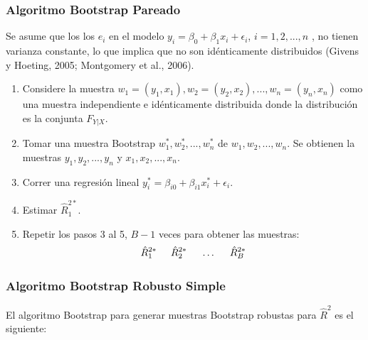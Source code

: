 \subsubsection{Algoritmo Bootstrap Pareado}

Se asume que los los $e_{i}$ en el modelo
$ y_{i} = \beta_{0} +\beta_{1}x_{i} + \epsilon_{i}$, $i=1,2,..., n$ , no tienen varianza constante, lo que implica que no son idénticamente distribuidos (Givens y Hoeting, 2005; Montgomery et al., 2006).

\begin{enumerate}
	\item Considere la muestra $ w_{1} = (y_{1}, x_{1}),  w_{2} = (y_{2}, x_{2}), ..., w_{n} = (y_{n}, x_{n})$ como una muestra independiente e idénticamente distribuida donde la distribución es la conjunta $ F_{Y|X} $.
	
	\item  Tomar una muestra Bootstrap  $ w^{*}_{1}, w^{*}_{2},...,  w^{*}_{n} $ de $w_{1}, w_{2},...,  w_{n} $. Se obtienen la muestras  $y_{1}, y_{2},...,  y_{n} $ y  $x_{1}, x_{2},...,  x_{n} $.
	
	\item Correr una regresión lineal $ y^{*}_{i} = \beta_{i0} +\beta_{i1}x_{i}^{*} + \epsilon_{i} $.
	
	\item Estimar  $ \hat{R}^{2*}_{1} $.
	
	\item  Repetir los pasos 3 al 5, $B - 1$ veces para obtener las muestras: 
	\[
	\hat{R}^{2*}_{1} \hspace{.5cm} \hat{R}^{2*}_{2} \hspace{.5cm} \dots \hspace{.5cm} \hat{R}^{2*}_{B}
	\]
\end{enumerate}


\subsubsection{Algoritmo Bootstrap Robusto Simple}
El algoritmo Bootstrap para generar muestras Bootstrap robustas para $\hat{R}^{2}$ es el siguiente:

